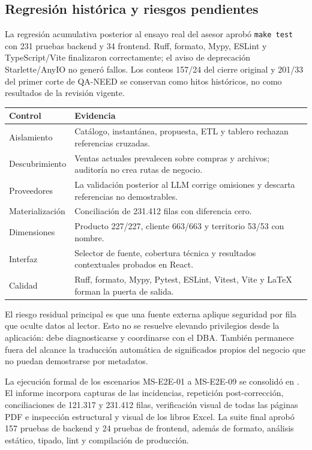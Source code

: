 \documentclass[11pt,letterpaper]{article}
\newcommand{\file}[1]{\texttt{#1}}
\begin{document}
\subsection{Regresión histórica y riesgos pendientes}

La regresión acumulativa posterior al ensayo real del asesor aprobó \file{make test}
con 231 pruebas backend y 34 frontend. Ruff, formato, Mypy, ESLint y TypeScript/Vite
finalizaron correctamente; el aviso de deprecación Starlette/AnyIO no generó fallos.
Los conteos 157/24 del cierre original y 201/33 del primer corte de QA-NEED se
conservan como hitos históricos, no como resultados de la revisión vigente.

\begin{tabularx}{\textwidth}{@{}p{}X@{}}
  \toprule
  Control & Evidencia \\
  \midrule
  Aislamiento & Catálogo, instantánea, propuesta, ETL y tablero rechazan referencias cruzadas. \\
  Descubrimiento & Ventas actuales prevalecen sobre compras y archivos; auditoría no crea rutas de negocio. \\
  Proveedores & La validación posterior al LLM corrige omisiones y descarta referencias no demostrables. \\
  Materialización & Conciliación de 231.412 filas con diferencia cero. \\
  Dimensiones & Producto 227/227, cliente 663/663 y territorio 53/53 con nombre. \\
  Interfaz & Selector de fuente, cobertura técnica y resultados contextuales probados en React. \\
  Calidad & Ruff, formato, Mypy, Pytest, ESLint, Vitest, Vite y LaTeX forman la puerta de salida. \\
  \bottomrule
\end{tabularx}

El riesgo residual principal es que una fuente externa aplique seguridad por fila que
oculte datos al lector. Esto no se resuelve elevando privilegios desde la aplicación: debe
diagnosticarse y coordinarse con el DBA. También permanece fuera del alcance la traducción
automática de significados propios del negocio que no puedan demostrarse por metadatos.

La ejecución formal de los escenarios MS-E2E-01 a MS-E2E-09 se consolidó en
. El informe incorpora
capturas de las incidencias, repetición post-corrección, conciliaciones de 121.317 y
231.412 filas, verificación visual de todas las páginas PDF e inspección estructural y
visual de los libros Excel. La suite final aprobó 157 pruebas de backend y 24 pruebas de
frontend, además de formato, análisis estático, tipado, lint y compilación de producción.
\end{document}
